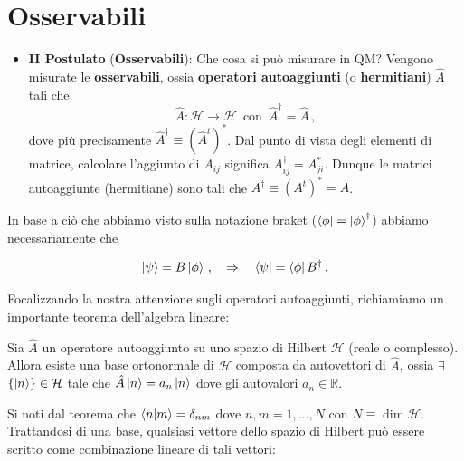 
\newpage
\noindent {}

\section{Osservabili}\label{sec:osservabili}

\begin{itemize}
    \item \textbf{II Postulato} (\textbf{Osservabili}): Che cosa si può misurare in QM? Vengono misurate le \textbf{osservabili}, ossia \textbf{operatori autoaggiunti} (o \textbf{hermitiani}) $\hat{A}$ tali che
    \begin{equation*}
        \hat{A}: \mathcal{H}\rightarrow \mathcal{H} \, \text{ con } \, \hat{A}^\dagger = \hat{A} \, ,
    \end{equation*}
    dove più precisamente $\hat{A}^\dagger \equiv (\hat{A}^t)^\ast$. Dal punto di vista degli elementi di matrice, calcolare l'aggiunto di $A_{ij}$ significa $A^\dagger_{ij} = A^\ast_{ji}$. Dunque le matrici autoaggiunte (hermitiane) sono tali che $A^\dagger \equiv (A^t)^\ast = A$.  
\end{itemize}

\noindent In base a ciò che abbiamo visto sulla notazione braket  ($\bra{\phi} = \ket{\phi}^\dagger$) abbiamo necessariamente che

\begin{equation*}
    \ket{\psi} = B \ket{\phi} \, , \quad \Rightarrow \quad  \bra{\psi} = \bra{\phi} B^\dagger \, .
\end{equation*}

\noindent Focalizzando la nostra attenzione sugli operatori autoaggiunti, richiamiamo un importante teorema dell'algebra lineare:
\begin{teorema}
    Sia $\hat{A}$ un operatore autoaggiunto su uno spazio di Hilbert $\mathcal{H}$ (reale o complesso). Allora esiste una base ortonormale di $\mathcal{H}$ composta da autovettori di $\hat{A}$, ossia $\exists$ $\lbrace \ket{n} \rbrace \in \mathcal{H}$ tale che $\hat{A} \ket{n} = a_n \ket{n}$ dove gli autovalori $a_n \in \mathbb{R}$.
\end{teorema}

\noindent Si noti dal teorema che $\braket{n}{m} = \delta_{nm}$ dove $n,m = 1, \ldots, N$ con $N \equiv \dim \mathcal{H}$. Trattandosi di una base, qualsiasi vettore dello spazio di Hilbert può essere scritto come combinazione lineare di tali vettori: 

